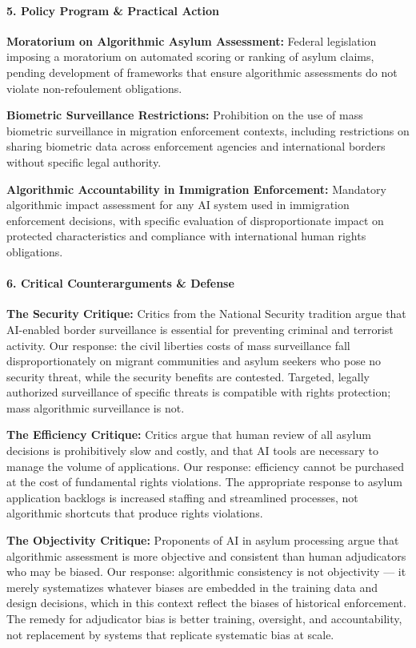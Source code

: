\paragraph{5. Policy Program \& Practical
Action}\label{policy-program-practical-action-49}

\textbf{Moratorium on Algorithmic Asylum Assessment:} Federal
legislation imposing a moratorium on automated scoring or ranking of
asylum claims, pending development of frameworks that ensure algorithmic
assessments do not violate non-refoulement obligations.

\textbf{Biometric Surveillance Restrictions:} Prohibition on the use of
mass biometric surveillance in migration enforcement contexts, including
restrictions on sharing biometric data across enforcement agencies and
international borders without specific legal authority.

\textbf{Algorithmic Accountability in Immigration Enforcement:}
Mandatory algorithmic impact assessment for any AI system used in
immigration enforcement decisions, with specific evaluation of
disproportionate impact on protected characteristics and compliance with
international human rights obligations.

\paragraph{6. Critical Counterarguments \&
Defense}\label{critical-counterarguments-defense-49}

\textbf{The Security Critique:} Critics from the National Security
tradition argue that AI-enabled border surveillance is essential for
preventing criminal and terrorist activity. Our response: the civil
liberties costs of mass surveillance fall disproportionately on migrant
communities and asylum seekers who pose no security threat, while the
security benefits are contested. Targeted, legally authorized
surveillance of specific threats is compatible with rights protection;
mass algorithmic surveillance is not.

\textbf{The Efficiency Critique:} Critics argue that human review of all
asylum decisions is prohibitively slow and costly, and that AI tools are
necessary to manage the volume of applications. Our response: efficiency
cannot be purchased at the cost of fundamental rights violations. The
appropriate response to asylum application backlogs is increased
staffing and streamlined processes, not algorithmic shortcuts that
produce rights violations.

\textbf{The Objectivity Critique:} Proponents of AI in asylum processing
argue that algorithmic assessment is more objective and consistent than
human adjudicators who may be biased. Our response: algorithmic
consistency is not objectivity --- it merely systematizes whatever
biases are embedded in the training data and design decisions, which in
this context reflect the biases of historical enforcement. The remedy
for adjudicator bias is better training, oversight, and accountability,
not replacement by systems that replicate systematic bias at scale.
